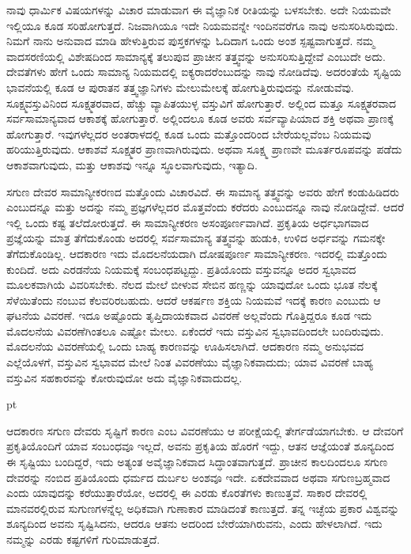 ನಾವು ಧಾರ್ಮಿಕ ವಿಷಯಗಳನ್ನು ವಿಚಾರ ಮಾಡುವಾಗ ಈ ವೈಜ್ಞಾನಿಕ ರೀತಿಯನ್ನು ಬಳಸಬೇಕು. ಅದೇ ನಿಯಮವೇ ಇಲ್ಲಿಯೂ ಕೂಡ ಸರಿಹೋಗುತ್ತದೆ. ನಿಜವಾಗಿಯೂ ಇದೇ ನಿಯಮವನ್ನೇ ಇಂದಿನವರೆಗೂ ನಾವು ಅನುಸರಿಸಿರುವುದು. ನಿಮಗೆ ನಾನು ಅನುವಾದ ಮಾಡಿ ಹೇಳುತ್ತಿರುವ ಪುಸ್ತಕಗಳನ್ನು ಓದಿದಾಗ ಒಂದು ಅಂಶ ಸ್ಪಷ್ಟವಾಗುತ್ತದೆ. ನಮ್ಮ ವಾದಸರಣಿಯಲ್ಲಿ ವಿಶೇಷದಿಂದ ಸಾಮಾನ್ಯಕ್ಕೆ ತಲುಪುವ ಪ್ರಾಚೀನ ತತ್ತ್ವವನ್ನು ಅನುಸರಿಸುತ್ತಿದ್ದೇವೆ ಎಂಬುದೇ ಅದು. ದೇವತೆಗಳು ಹೇಗೆ ಒಂದು ಸಾಮಾನ್ಯ ನಿಯಮದಲ್ಲಿ ಐಕ್ಯರಾದರೆಂಬುದನ್ನು ನಾವು ನೋಡಿದೆವು. ಅದರಂತೆಯೆ ಸೃಷ್ಟಿಯ ಭಾವನೆಯಲ್ಲಿ ಕೂಡ ಆ ಪುರಾತನ ತತ್ತ್ವಜ್ಞಾನಿಗಳು ಮೇಲುಮೇಲಕ್ಕೆ ಹೋಗುತ್ತಿರುವುದನ್ನು ನೋಡುವೆವು. ಸೂಕ್ಷ್ಮವಸ್ತುವಿನಿಂದ ಸೂಕ್ಷ್ಮತರವಾದ, ಹೆಚ್ಚು ವ್ಯಾಪಿತಯುಳ್ಳ ವಸ್ತುವಿಗೆ ಹೋಗುತ್ತಾರೆ. ಅಲ್ಲಿಂದ ಮತ್ತೂ ಸೂಕ್ಷ್ಮತರವಾದ ಸರ್ವಸಾಮಾನ್ಯವಾದ ಆಕಾಶಕ್ಕೆ ಹೋಗುತ್ತಾರೆ. ಅಲ್ಲಿಂದಲೂ ಕೂಡ ಅವರು ಸರ್ವವ್ಯಾಪಿಯಾದ ಶಕ್ತಿ ಅಥವಾ ಪ್ರಾಣಕ್ಕೆ ಹೋಗುತ್ತಾರೆ. ಇವುಗಳೆಲ್ಲದರ ಅಂತರಾಳದಲ್ಲಿ ಕೂಡ ಒಂದು ಮತ್ತೊಂದರಿಂದ ಬೇರೆಯಲ್ಲವೆಂಬ ನಿಯಮವು ಹರಿಯುತ್ತಿರುವುದು. ಆಕಾಶವೆ ಸೂಕ್ಷ್ಮತರ ಪ್ರಾಣವಾಗಿರುವುದು. ಅಥವಾ ಸೂಕ್ಷ್ಮ ಪ್ರಾಣವೇ ಮೂರ್ತರೂಪವನ್ನು ಪಡೆದು ಆಕಾಶವಾಗುವುದು, ಮತ್ತು ಆಕಾಶವು ಇನ್ನೂ ಸ್ಥೂಲವಾಗುವುದು, ಇತ್ಯಾದಿ. 


ಸಗುಣ ದೇವರ ಸಾಮಾನ್ಯೀಕರಣದ ಮತ್ತೊಂದು ವಿಚಾರವಿದೆ. ಈ ಸಾಮಾನ್ಯ ತತ್ತ್ವವನ್ನು ಅವರು ಹೇಗೆ ಕಂಡುಹಿಡಿದರು ಎಂಬುದನ್ನೂ ಮತ್ತು ಅದನ್ನು ನಮ್ಮ ಪ್ರಜ್ಞಗಳೆಲ್ಲದರ ಮೊತ್ತವೆಂದು ಕರೆದರು ಎಂಬುದನ್ನೂ ನಾವು ನೋಡಿದ್ದೇವೆ. ಆದರೆ ಇಲ್ಲಿ ಒಂದು ಕಷ್ಟ ತಲೆದೋರುತ್ತದೆ. ಈ ಸಾಮಾನ್ಯೀಕರಣ ಅಸಂಪೂರ್ಣವಾಗಿದೆ. ಪ್ರಕೃತಿಯ ಅರ್ಧಭಾಗವಾದ ಪ್ರಜ್ಞೆಯನ್ನು ಮಾತ್ರ ತೆಗೆದುಕೊಂಡು ಅದರಲ್ಲಿ ಸರ್ವಸಾಮಾನ್ಯ ತತ್ತ್ವವನ್ನು ಹುಡುಕಿ, ಉಳಿದ ಅರ್ಧವನ್ನು ಗಮನಕ್ಕೇ ತೆಗೆದುಕೊಂಡಿಲ್ಲ. ಆದಕಾರಣ ಇದು ಮೊದಲನೆಯದಾಗಿ ದೋಷಪೂರ್ಣ ಸಾಮಾನ್ಯೀಕರಣ. ಇದರಲ್ಲಿ ಮತ್ತೊಂದು ಕುಂದಿದೆ. ಅದು ಎರಡನೆಯ ನಿಯಮಕ್ಕೆ ಸಂಬಂಧಪಟ್ಟದ್ದು. ಪ್ರತಿಯೊಂದು ವಸ್ತುವನ್ನೂ ಅದರ ಸ್ವಭಾವದ ಮೂಲಕವಾಗಿಯೆ ವಿವರಿಸಬೇಕು. ನೆಲದ ಮೇಲೆ ಬೀಳುವ ಸೇಬಿನ ಹಣ್ಣನ್ನು ಯಾವುದೋ ಒಂದು ಭೂತ ನೆಲಕ್ಕೆ ಸೆಳೆಯಿತೆಂದು ನಂಬುವ ಕೆಲವರಿರಬಹುದು. ಆದರೆ ಆಕರ್ಷಣ ಶಕ್ತಿಯ ನಿಯಮವೆ ಇದಕ್ಕೆ ಕಾರಣ ಎಂಬುದು ಆ ಘಟನೆಯ ವಿವರಣೆ. ಇದೂ ಅಷ್ಟೊಂದು ತೃಪ್ತಿದಾಯಕವಾದ ವಿವರಣೆ ಅಲ್ಲವೆಂದು ಗೊತ್ತಿದ್ದರೂ ಕೂಡ ಇದು ಮೊದಲನೆಯ ವಿವರಣೆಗಿಂತಲೂ ಎಷ್ಟೋ ಮೇಲು. ಏಕೆಂದರೆ ಇದು ವಸ್ತುವಿನ ಸ್ವಭಾವದಿಂದಲೇ ಬಂದಿರುವುದು. ಮೊದಲನೆಯ ವಿವರಣೆಯಲ್ಲಿ ಒಂದು ಬಾಹ್ಯ ಕಾರಣವನ್ನು ಊಹಿಸಲಾಗಿದೆ. ಆದಕಾರಣ ನಮ್ಮ ಅನುಭವದ ಎಲ್ಲೆಯೊಳಗೆ, ವಸ್ತುವಿನ ಸ್ವಭಾವದ ಮೇಲೆ ನಿಂತ ವಿವರಣೆಯು ವೈಜ್ಞಾನಿಕವಾದುದು; ಯಾವ ವಿವರಣೆ ಬಾಹ್ಯ ವಸ್ತುವಿನ ಸಹಕಾರವನ್ನು ಕೋರುವುದೋ ಅದು ವೈಜ್ಞಾನಿಕವಾದುದಲ್ಲ. 

	pt

ಆದಕಾರಣ ಸಗುಣ ದೇವರು ಸೃಷ್ಟಿಗೆ ಕಾರಣ ಎಂಬ ವಿವರಣೆಯು ಆ ಪರೀಕ್ಷೆಯಲ್ಲಿ ತೇರ್ಗಡೆಯಾಗಬೇಕು. ಆ ದೇವರಿಗೆ ಪ್ರಕೃತಿಯೊಂದಿಗೆ ಯಾವ ಸಂಬಂಧವೂ ಇಲ್ಲದೆ, ಅವನು ಪ್ರಕೃತಿಯ ಹೊರಗೆ ಇದ್ದು, ಆತನ ಆಜ್ಞೆಯಂತೆ ಶೂನ್ಯದಿಂದ ಈ ಸೃಷ್ಟಿಯು ಬಂದಿದ್ದರೆ, ಇದು ಅತ್ಯಂತ ಅವೈಜ್ಞಾನಿಕವಾದ ಸಿದ್ಧಾಂತವಾಗುತ್ತದೆ. ಪ್ರಾಚೀನ ಕಾಲದಿಂದಲೂ ಸಗುಣ ದೇವರನ್ನು ನಂಬಿದ ಪ್ರತಿಯೊಂದು ಧರ್ಮದ ದುರ್ಬಲ ಅಂಶವೂ ಇದೇ. ಏಕದೇವವಾದ ಅಥವಾ ಸಗುಣಬ್ರಹ್ಮವಾದ ಎಂದು ಯಾವುದನ್ನು ಕರೆಯುತ್ತಾರೆಯೋ, ಅದರಲ್ಲಿ ಈ ಎರಡು ಕೊರತೆಗಳು ಕಾಣುತ್ತವೆ. ಸಾಕಾರ ದೇವರಲ್ಲಿ ಮಾನವರಲ್ಲಿರುವ ಸುಗುಣಗಳನ್ನೆಲ್ಲ ಅಧಿಕವಾಗಿ ಗುಣಾಕಾರ ಮಾಡಿದಂತೆ ಕಾಣುತ್ತದೆ. ತನ್ನ ಇಚ್ಛೆಯ ಪ್ರಕಾರ ವಿಶ್ವವನ್ನು ಶೂನ್ಯದಿಂದ ಅವನು ಸೃಷ್ಟಿಸಿದನು, ಆದರೂ ಆತನು ಅದರಿಂದ ಬೇರೆಯಾಗಿರುವನು, ಎಂದು ಹೇಳಲಾಗಿದೆ. ಇದು ನಮ್ಮನ್ನು ಎರಡು ಕಷ್ಟಗಳಿಗೆ ಗುರಿಮಾಡುತ್ತದೆ. 

